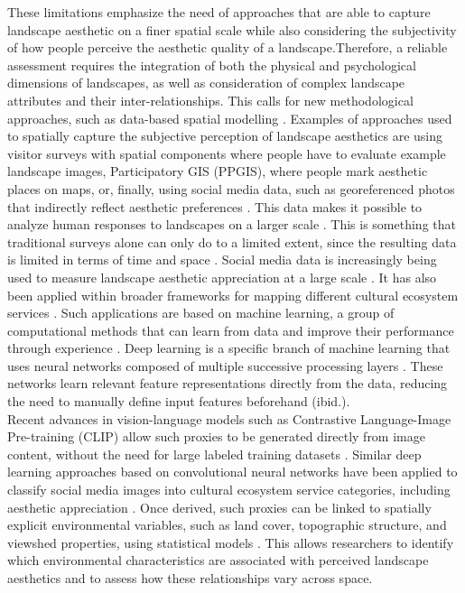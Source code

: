 \documentclass[11pt]{article}
\renewcommand{\_}{\textunderscore\allowbreak{}}
\begin{document}
These limitations emphasize the need of approaches that are able to capture landscape aesthetic on a finer spatial scale while also considering the subjectivity of how people perceive the aesthetic quality of a landscape.Therefore, a reliable assessment requires the integration of both the physical and psychological dimensions of landscapes, as well as consideration of complex landscape attributes and their inter-relationships. This calls for new methodological approaches, such as data-based spatial modelling \citep{de_la_fuente_de_val_relationship_2006,sahraoui_spatial_2016}. Examples of approaches used to spatially capture the subjective perception of landscape aesthetics are using visitor surveys with spatial components where people have to evaluate example landscape images, Participatory GIS (PPGIS), where people mark aesthetic places on maps, or, finally, using social media data, such as georeferenced photos that indirectly reflect aesthetic preferences \citep{schirpke_predicting_2013,valanszki_assessing_2022,comalada_modelling_2025,langemeyer_mapping_2018,tieskens_aesthetic_2018,liao_mapping_2025}.  This data makes it possible to analyze human responses to landscapes on a larger scale \citep{cardoso_classifying_2022}. This is something that traditional surveys alone can only do to a limited extent, since the resulting data is limited in terms of time and space \citep{cardoso_classifying_2022,yoshimura_demand_2017}. Social media data is increasingly being used to measure landscape aesthetic appreciation at a large scale \citep{havinga_social_2021, gosal_landscape_2020,despotovic_beautiful_2025}. It has also been applied within broader frameworks for mapping different cultural ecosystem services \citep{liao_mapping_2025}. Such applications are based on machine learning, a group of computational methods that can learn from data and improve their performance through experience \citep{jordan_machine_2015}. Deep learning is a specific branch of machine learning that uses neural networks composed of multiple successive processing layers \citep{lecun_deep_2015}. These networks learn relevant feature representations directly from the data, reducing the need to manually define input features beforehand (ibid.).
\\
Recent advances in vision-language models such as Contrastive Language-Image Pre-training (CLIP) allow such proxies to be generated directly from image content, without the need for large labeled training datasets \citep{liao_mapping_2025,radford_learning_2021}. Similar deep learning approaches based on convolutional neural networks have been applied to classify social media images into cultural ecosystem service categories, including aesthetic appreciation \citep{cardoso_classifying_2022}. Once derived, such proxies can be linked to spatially explicit environmental variables, such as land cover, topographic structure, and viewshed properties, using statistical models \citep{schirpke_predicting_2013, vaz_digital_2020}. This allows researchers to identify which environmental characteristics are associated with perceived landscape aesthetics and to assess how these relationships vary across space.
\end{document}
